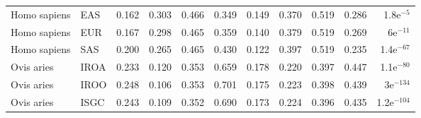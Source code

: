 \begin{longtable}{llrrrrrrrrr}
        Homo sapiens &                       EAS &                              0.162 &                               0.303 &                 0.466 &                 0.349 &                              0.149 &                               0.370 &                 0.519 &                 0.286 &   1.8e$^{-5}$ \\
        Homo sapiens &                       EUR &                              0.167 &                               0.298 &                 0.465 &                 0.359 &                              0.140 &                               0.379 &                 0.519 &                 0.269 &    6e$^{-11}$ \\
        Homo sapiens &                       SAS &                              0.200 &                               0.265 &                 0.465 &                 0.430 &                              0.122 &                               0.397 &                 0.519 &                 0.235 &  1.4e$^{-67}$ \\
          Ovis aries &                      IROA &                              0.233 &                               0.120 &                 0.353 &                 0.659 &                              0.178 &                               0.220 &                 0.397 &                 0.447 &  1.1e$^{-80}$ \\
          Ovis aries &                      IROO &                              0.248 &                               0.106 &                 0.353 &                 0.701 &                              0.175 &                               0.223 &                 0.398 &                 0.439 &   3e$^{-134}$ \\
          Ovis aries &                      ISGC &                              0.243 &                               0.109 &                 0.352 &                 0.690 &                              0.173 &                               0.224 &                 0.396 &                 0.435 & 1.2e$^{-104}$ \\
\end{longtable}
